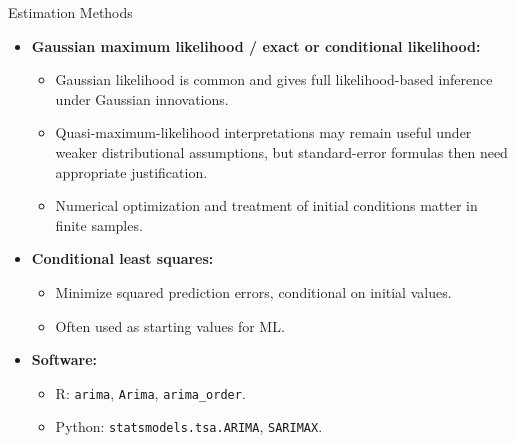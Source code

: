 \documentclass{beamer}
\begin{document}
\begin{frame}{Estimation Methods}
  \begin{itemize}
    \item \textbf{Gaussian maximum likelihood / exact or conditional likelihood:}
      \begin{itemize}
        \item Gaussian likelihood is common and gives full likelihood-based inference under Gaussian innovations.
        \item Quasi-maximum-likelihood interpretations may remain useful under weaker distributional assumptions, but standard-error formulas then need appropriate justification.
        \item Numerical optimization and treatment of initial conditions matter in finite samples.
      \end{itemize}
    \item \textbf{Conditional least squares:}
      \begin{itemize}
        \item Minimize squared prediction errors, conditional on initial values.
        \item Often used as starting values for ML.
      \end{itemize}
    \item \textbf{Software:}
      \begin{itemize}
        \item R: \texttt{arima}, \texttt{Arima}, \texttt{arima\_order}.
        \item Python: \texttt{statsmodels.tsa.ARIMA}, \texttt{SARIMAX}.
      \end{itemize}
  \end{itemize}
\end{frame}
\end{document}
